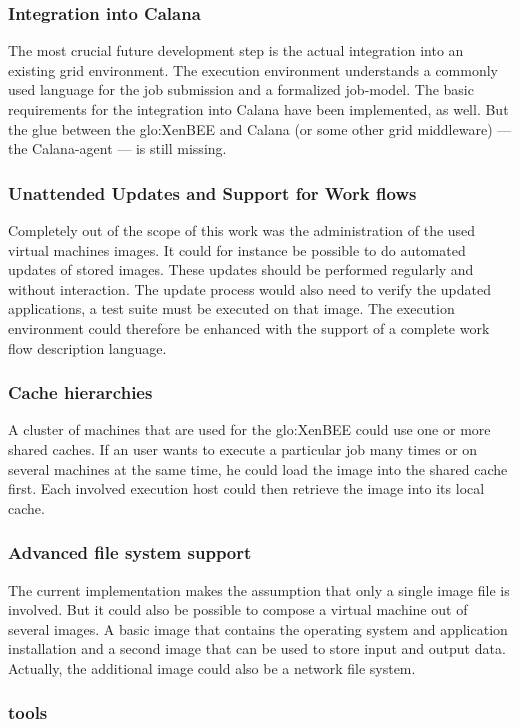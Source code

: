 \subsubsection{Integration into Calana}

The most crucial future development step is the actual integration into an
existing  grid  environment.   The  execution  environment  understands  a
commonly used language for the  job submission and a formalized job-model.
The  basic  requirements  for   the  integration  into  Calana  have  been
implemented,  as well.   But  the glue  between  the \gls{glo:XenBEE}  and
Calana (or some  other grid middleware) --- the  Calana-agent --- is still
missing.

\subsubsection{Unattended Updates and Support for Work flows}

Completely out  of the scope  of this work  was the administration  of the
used virtual  machines images.   It could for  instance be possible  to do
automated  updates of stored  images.  These  updates should  be performed
regularly and without interaction.  The  update process would also need to
verify the updated applications, \ie a test suite must be executed on that
image.   The execution environment  could therefore  be enhanced  with the
support of a complete work flow description language.

\subsubsection{Cache hierarchies}

A cluster of machines that are used for the \gls{glo:XenBEE} could use one
or more shared  caches. If an user wants to execute  a particular job many
times or  on several machines  at the same  time, he could load  the image
into  the shared  cache first.   Each involved  execution host  could then
retrieve the image into its local cache.

\subsubsection{Advanced file system support}

The current implementation  makes the assumption that only  a single image
file is  involved.  But  it could  also be possible  to compose  a virtual
machine out of  several images. A basic image  that contains the operating
system and application installation and a second image that can be used to
store input and output data.  Actually, the additional image could also be
a network file system.

\subsubsection{tools}
\label{sec:tools}



